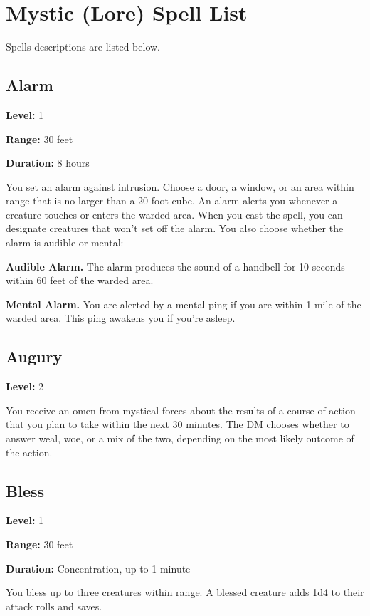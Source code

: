 \documentclass[12pt,letterpaper,twocolumn,openany,nodeprecatedcode,bg=none]{dndbook}
\let\oldsubsection\subsection
\renewcommand{\subsection}[1]{%
  \needspace{5\baselineskip}%
  \oldsubsection{#1}%
}
\begin{document}
\newpage

\section{Mystic (Lore) Spell List}\label{mystic-lore-spell-list}

Spells descriptions are listed below.

\subsection{Alarm}\label{alarm}

\textbf{Level:} 1

\textbf{Range:} 30 feet

\textbf{Duration:} 8 hours

You set an alarm against intrusion. Choose a door, a window, or an area
within range that is no larger than a 20-foot cube. An alarm alerts you
whenever a creature touches or enters the warded area. When you cast the
spell, you can designate creatures that won't set off the alarm. You
also choose whether the alarm is audible or mental:

\textbf{Audible Alarm.} The alarm produces the sound of a handbell for
10 seconds within 60 feet of the warded area.

\textbf{Mental Alarm.} You are alerted by a mental ping if you are
within 1 mile of the warded area. This ping awakens you if you're
asleep.

\subsection{Augury}\label{augury}

\textbf{Level:} 2

You receive an omen from mystical forces about the results of a course
of action that you plan to take within the next 30 minutes. The DM
chooses whether to answer weal, woe, or a mix of the two, depending on
the most likely outcome of the action.

\subsection{Bless}\label{bless}

\textbf{Level:} 1

\textbf{Range:} 30 feet

\textbf{Duration:} Concentration, up to 1 minute

You bless up to three creatures within range. A blessed creature adds
1d4 to their attack rolls and saves.
\end{document}
